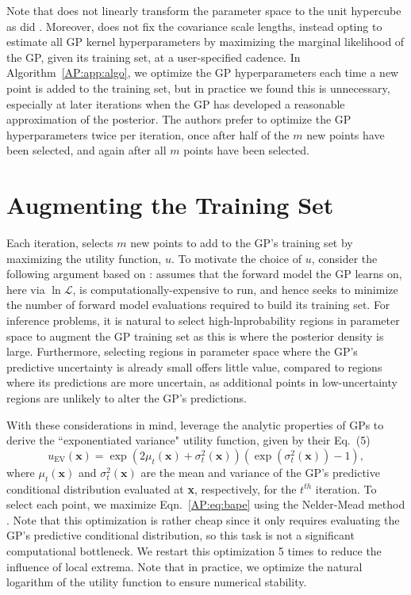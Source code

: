 Note that \approxposterior does not linearly transform the parameter space to the unit hypercube as did \citet{Kandasamy2017}. Moreover, \approxposterior does not fix the covariance scale lengths, instead opting to estimate all GP kernel hyperparameters by maximizing the marginal likelihood of the GP, given its training set, at a user-specified cadence. In Algorithm~\ref{AP:app:algo}, we optimize the GP hyperparameters each time a new point is added to the training set, but in practice we found this is unnecessary, especially at later iterations when the GP has developed a reasonable approximation of the posterior. The authors prefer to optimize the GP hyperparameters twice per iteration, once after half of the $m$ new points have been selected, and again after all $m$ points have been selected.

\section{Augmenting the Training Set} \label{AP:sec:augment}

Each iteration, \approxposterior selects $m$ new points to add to the GP's training set by maximizing the utility function, $u$. To motivate the choice of $u$, consider the following argument based on \citet{Kandasamy2017}: \approxposterior assumes that the forward model the GP learns on, here \vplanet via $\ln \mathcal{L}$, is computationally-expensive to run, and hence \approxposterior seeks to minimize the number of forward model evaluations required to build its training set. For inference problems, it is natural to select high-lnprobability regions in parameter space to augment the GP training set as this is where the posterior density is large. Furthermore, selecting regions in parameter space where the GP's predictive uncertainty is already small offers little value, compared to regions where its predictions are more uncertain, as additional points in low-uncertainty regions are unlikely to alter the GP's predictions. 

With these considerations in mind, \citet{Kandasamy2017} leverage the analytic properties of GPs to derive the ``exponentiated variance" utility function, given by their Eq.~(5)
\begin{equation} \label{AP:eq:bape}
    u_{\textrm{EV}}(\textbf{x}) = \exp(2 \mu_t(\textbf{x}) + \sigma_t^2(\textbf{x}))(\exp(\sigma_t^2(\textbf{x})) - 1),
\end{equation}
where $\mu_t(\textbf{x})$ and $\sigma_t^2(\textbf{x})$ are the mean and variance of the GP's predictive conditional distribution evaluated at \textbf{x}, respectively, for the $t^{th}$ \approxposterior iteration. To select each point, we maximize Eqn.~\ref{AP:eq:bape} using the Nelder-Mead method \citep{Nelder1965}. Note that this optimization is rather cheap since it only requires evaluating the GP's predictive conditional distribution, so this task is not a significant computational bottleneck. We restart this optimization 5 times to reduce the influence of local extrema. Note that in practice, we optimize the natural logarithm of the utility function to ensure numerical stability.

